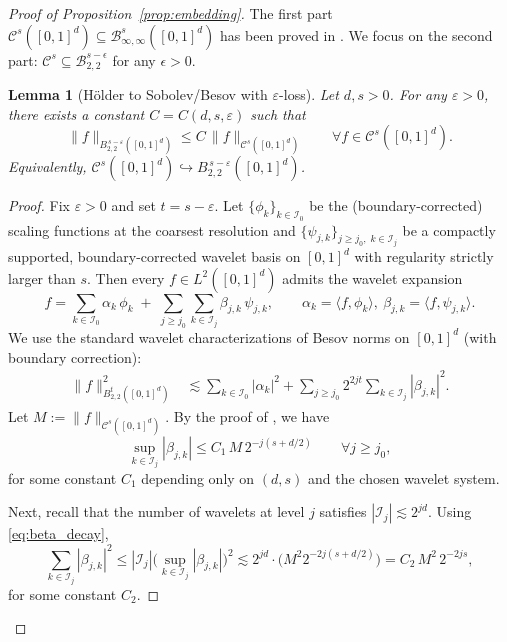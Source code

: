 \documentclass{article}
\theoremstyle{plain}
\newtheorem{lemma}{Lemma}[section]
\theoremstyle{definition}
\def\calC{\mathcal{C}}
\def\calI{\mathcal{I}}
\theoremstyle{plain}
\def\calC{\mathcal{C}}
\def\calI{\mathcal{I}}
\begin{document}
\begin{proof}[Proof of Proposition~\ref{prop:embedding}]
The first part $\calC^s([0,1]^d) \subseteq \mathcal{B}^s_{\infty,\infty}([0,1]^{d})$ has been proved in \cite[Lemma 25]{manole2024plugin}. We focus on the second part: $\calC^s \subseteq \mathcal{B}^{s - \epsilon}_{2,2}$ for any $\epsilon > 0$.

    \begin{lemma}[H\"older to Sobolev/Besov with $\varepsilon$-loss]\label{lem:Holder_to_Besov_eps}
Let $d, s>0$. For any $\varepsilon>0$, there exists a constant $C=C(d,s,\varepsilon)$ such that
\[
\|f\|_{B^{\,s-\varepsilon}_{2,2}([0,1]^d)} \le C\,\|f\|_{\calC^{s}([0,1]^d)}
\qquad \forall f\in \calC^{s}([0,1]^d).
\]
Equivalently, $\calC^{s}([0,1]^d)\hookrightarrow B^{\,s-\varepsilon}_{2,2}([0,1]^d)$.
\end{lemma}

\begin{proof}
Fix $\varepsilon>0$ and set $t=s-\varepsilon$. Let $\{\phi_k\}_{k\in\calI_0}$ be the (boundary-corrected) scaling functions at the coarsest resolution and
$\{\psi_{j,k}\}_{j\ge j_0,\;k\in\calI_j}$ be a compactly supported, boundary-corrected wavelet basis on $[0,1]^d$ with regularity strictly larger than $s$.
Then every $f\in L^2([0,1]^d)$ admits the wavelet expansion
\[
f
=
\sum_{k\in\calI_0} \alpha_k\,\phi_k
\;+\;
\sum_{j\ge j_0}\sum_{k\in\calI_j} \beta_{j,k}\,\psi_{j,k},
\qquad
\alpha_k=\langle f,\phi_k\rangle,\ \beta_{j,k}=\langle f,\psi_{j,k}\rangle .
\]
We use the standard wavelet characterizations of Besov norms on $[0,1]^d$ (with boundary correction):
\begin{align}
\|f\|_{B^{t}_{2,2}([0,1]^d)}^2
&\lesssim
\sum_{k\in\calI_0}|\alpha_k|^2
+
\sum_{j\ge j_0} 2^{2jt}\sum_{k\in\calI_j}|\beta_{j,k}|^2 .
\label{eq:Besov_wavelet_char}
\end{align}
Let $M:=\|f\|_{\calC^{s}([0,1]^d)}$. By the proof of \cite[Lemma 25]{manole2024plugin}, we have
\begin{equation}\label{eq:beta_decay}
\sup_{k\in\calI_j}|\beta_{j,k}|
\le
C_1\, M\, 2^{-j(s+d/2)}
\qquad \forall j\ge j_0,
\end{equation}
for some constant $C_1$ depending only on $(d,s)$ and the chosen wavelet system.

Next, recall that the number of wavelets at level $j$ satisfies $|\calI_j|\lesssim 2^{jd}$.
Using \eqref{eq:beta_decay},
\begin{equation}\label{eq:l2_bound_each_scale}
\sum_{k\in\calI_j}|\beta_{j,k}|^2
\le
|\calI_j|\Big(\sup_{k\in\calI_j}|\beta_{j,k}|\Big)^2
\lesssim
2^{jd}\cdot \big(M^2 2^{-2j(s+d/2)}\big)
=
C_2\,M^2\,2^{-2js},
\end{equation}
for some constant $C_2$.


\end{proof}
\end{proof}
\end{document}
